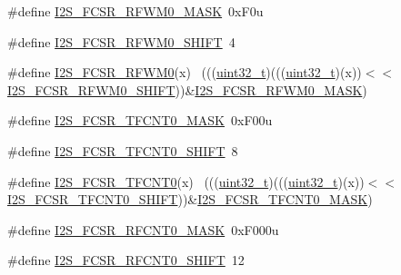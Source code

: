 \begin{DoxyCompactItemize}
\item 
\#define \hyperlink{group___i2_s___register___masks_ga34ed5467f43174b429cd288799639e59}{I2\+S\+\_\+\+F\+C\+S\+R\+\_\+\+R\+F\+W\+M0\+\_\+\+M\+A\+SK}~0x\+F0u
\item 
\#define \hyperlink{group___i2_s___register___masks_ga031de16d3e01638af6a0c7d3c797b972}{I2\+S\+\_\+\+F\+C\+S\+R\+\_\+\+R\+F\+W\+M0\+\_\+\+S\+H\+I\+FT}~4
\item 
\#define \hyperlink{group___i2_s___register___masks_gacd6939a63deeff09f28517b972c3b19a}{I2\+S\+\_\+\+F\+C\+S\+R\+\_\+\+R\+F\+W\+M0}(x)                                            ~(((\hyperlink{_p_e___types_8h_a33594304e786b158f3fb30289278f5af}{uint32\+\_\+t})(((\hyperlink{_p_e___types_8h_a33594304e786b158f3fb30289278f5af}{uint32\+\_\+t})(x))$<$$<$\hyperlink{group___i2_s___register___masks_ga031de16d3e01638af6a0c7d3c797b972}{I2\+S\+\_\+\+F\+C\+S\+R\+\_\+\+R\+F\+W\+M0\+\_\+\+S\+H\+I\+FT}))\&\hyperlink{group___i2_s___register___masks_ga34ed5467f43174b429cd288799639e59}{I2\+S\+\_\+\+F\+C\+S\+R\+\_\+\+R\+F\+W\+M0\+\_\+\+M\+A\+SK})
\item 
\#define \hyperlink{group___i2_s___register___masks_gab56f1490303d7999cfbad0c62e031ec6}{I2\+S\+\_\+\+F\+C\+S\+R\+\_\+\+T\+F\+C\+N\+T0\+\_\+\+M\+A\+SK}~0x\+F00u
\item 
\#define \hyperlink{group___i2_s___register___masks_ga6d4747136ef98558bcd4d12e40982b02}{I2\+S\+\_\+\+F\+C\+S\+R\+\_\+\+T\+F\+C\+N\+T0\+\_\+\+S\+H\+I\+FT}~8
\item 
\#define \hyperlink{group___i2_s___register___masks_ga7a2271b30d58cf2910228ff7bcf27522}{I2\+S\+\_\+\+F\+C\+S\+R\+\_\+\+T\+F\+C\+N\+T0}(x)                                          ~(((\hyperlink{_p_e___types_8h_a33594304e786b158f3fb30289278f5af}{uint32\+\_\+t})(((\hyperlink{_p_e___types_8h_a33594304e786b158f3fb30289278f5af}{uint32\+\_\+t})(x))$<$$<$\hyperlink{group___i2_s___register___masks_ga6d4747136ef98558bcd4d12e40982b02}{I2\+S\+\_\+\+F\+C\+S\+R\+\_\+\+T\+F\+C\+N\+T0\+\_\+\+S\+H\+I\+FT}))\&\hyperlink{group___i2_s___register___masks_gab56f1490303d7999cfbad0c62e031ec6}{I2\+S\+\_\+\+F\+C\+S\+R\+\_\+\+T\+F\+C\+N\+T0\+\_\+\+M\+A\+SK})
\item 
\#define \hyperlink{group___i2_s___register___masks_gaeef8059aa847e9a068dcaa2f2ee2c05f}{I2\+S\+\_\+\+F\+C\+S\+R\+\_\+\+R\+F\+C\+N\+T0\+\_\+\+M\+A\+SK}~0x\+F000u
\item 
\#define \hyperlink{group___i2_s___register___masks_gae7fe6541dbfc69a78642e31d00a00c8a}{I2\+S\+\_\+\+F\+C\+S\+R\+\_\+\+R\+F\+C\+N\+T0\+\_\+\+S\+H\+I\+FT}~12
\item 

\end{DoxyCompactItemize}
